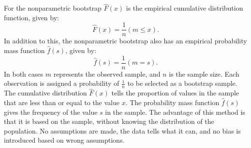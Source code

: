 \noindent For the nonparametric bootstrap $\hat{F}(x)$ is the empirical cumulative distribution function, given by:
\begin{equation}
\hat{F}(x)=\frac{1}{n}(m\leq x).
\end{equation}
In addition to this, the nonparametric bootstrap also has an empirical probability mass function $\hat{f}(s)$, given by:
\begin{equation}
	\hat{f}(s)=\frac{1}{n}(m=s).
\end{equation}
In both cases $m$ represents the observed sample, and $n$ is the sample size. Each observation is assigned a probability of $\frac{1}{n}$ to be selected as a bootstrap sample. The  cumulative distribution $\hat{F}(x)$ tells the proportion of values in the sample that are less than or equal to the value $x$. The probability mass function $\hat{f}(s)$ gives the frequency of the value $s$ in the sample. The advantage of this method is that it is based on the sample, without knowing the distribution of the population. No assumptions are made, the data tells what it can, and no bias is introduced based on wrong assumptions.